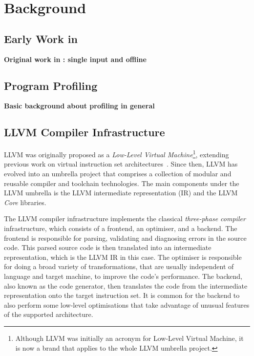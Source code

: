 \chapter{Background}

\section{Early Work in {\IterComp}}

\textbf{Original work in {\IterComp}: single input and offline}

\section{Program Profiling}

\textbf{Basic background about profiling in general}

\section{LLVM Compiler Infrastructure}

LLVM was originally proposed as a \textit{Low-Level Virtual Machine}\footnote{Although LLVM was initially an acronym for Low-Level Virtual Machine, it is now a brand that applies to the whole LLVM umbrella project.}, extending previous work on virtual instruction set architectures~\citep{adve03,lattner04}.
Since then, LLVM has evolved into an umbrella project that comprises a collection of modular and reusable compiler and toolchain technologies.
The main components under the LLVM umbrella is the LLVM intermediate representation (IR) and the LLVM \textit{Core} libraries.

The LLVM compiler infrastructure implements the classical \textit{three-phase compiler} infrastructure, which consists of a frontend, an optimiser, and a backend.
The frontend is responsible for parsing, validating and diagnosing errors in the source code.
This parsed source code is then translated into an intermediate representation, which is the LLVM IR in this case.
The optimiser is responsible for doing a broad variety of transformations, that are usually independent of language and target machine, to improve the code's performance.
The backend, also known as the code generator, then translates the code from the intermediate representation onto the target instruction set.
It is common for the backend to also perform some low-level optimisations that take advantage of unusual features of the supported architecture.

